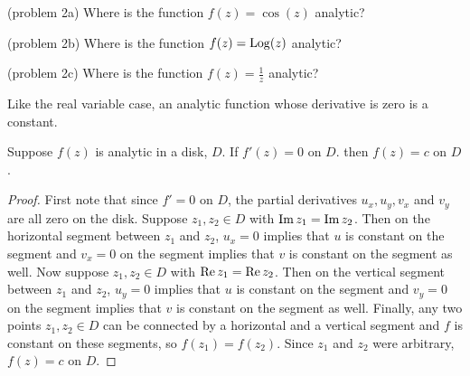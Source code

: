 \documentclass[handout]{ximera}
\begin{document}
\begin{problem}(problem 2a)
Where is the function $f(z) = \cos(z)$ analytic?\\
\begin{multipleChoice}
\end{multipleChoice}
\end{problem}

\begin{problem}(problem 2b)
Where is the function $f(z) = \operatorname{Log}(z)$ analytic?\\
\begin{multipleChoice}
\end{multipleChoice}
\end{problem}

\begin{problem}(problem 2c)
Where is the function $f(z) = \frac{1}{z}$ analytic?\\
\begin{multipleChoice}
\end{multipleChoice}
\end{problem}

Like the real variable case, an analytic function whose derivative is zero is a constant.

\begin{theorem}
Suppose $f(z)$ is analytic in a disk, $D$. If $f'(z) =0$ on $D$.
then $f(z) =c$ on $D$.
\end{theorem}
\begin{proof}
First note that since $f'=0$ on $D$, the partial derivatives $u_x, u_y, v_x$ and $v_y$ 
are all zero on the disk.
Suppose $z_1, z_2 \in D$ with $\operatorname{Im} z_1 = \operatorname{Im} z_2$. Then on the horizontal segment 
between $z_1$ and $z_2$, $u_x = 0$ implies that $u$ is constant 
on the segment and $v_x =0$ on the segment implies that $v$ is constant on the segment as well.
Now suppose $z_1, z_2 \in D$ with $\operatorname{Re} z_1 = \operatorname{Re} z_2$. Then on the vertical segment 
between $z_1$ and $z_2$, $u_y = 0$ implies that $u$ is constant 
on the segment and $v_y =0$ on the segment implies that $v$ is constant on the segment as well.
Finally, any two points $z_1, z_2 \in D$ can be connected by a horizontal and a 
vertical segment and $f$ is constant on these segments, so $f(z_1) = f(z_2)$.
Since $z_1$ and $z_2$ were arbitrary, $f(z) =c$ on $D$. 
\end{proof}
\end{document}
